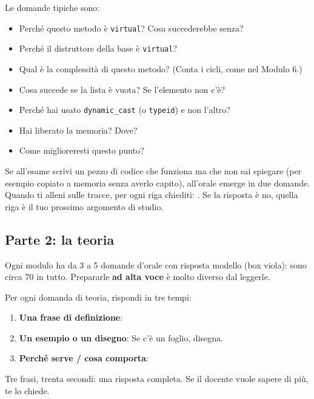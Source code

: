 Le domande tipiche sono:
\begin{itemize}
  \item Perché questo metodo è \texttt{virtual}? Cosa succederebbe senza?
  \item Perché il distruttore della base è \texttt{virtual}?
  \item Qual è la complessità di questo metodo? (Conta i cicli, come nel Modulo 6.)
  \item Cosa succede se la lista è vuota? Se l'elemento non c'è?
  \item Perché hai usato \texttt{dynamic\_cast} (o \texttt{typeid}) e non l'altro?
  \item Hai liberato la memoria? Dove?
  \item Come miglioreresti questo punto?
\end{itemize}

\begin{trappola}
Se all'esame scrivi un pezzo di codice che funziona ma che non sai spiegare (per esempio
copiato a memoria senza averlo capito), all'orale emerge in due domande. Quando ti alleni
sulle tracce, per ogni riga chiediti: . Se la risposta è no,
quella riga è il tuo prossimo argomento di studio.
\end{trappola}

\subsection*{Parte 2: la teoria}

Ogni modulo ha da 3 a 5 domande d'orale con risposta modello (box viola): sono circa 70
in tutto. Prepararle \textbf{ad alta voce} è molto diverso dal leggerle.

\begin{passopasso}
Per ogni domanda di teoria, rispondi in tre tempi:
\begin{enumerate}
  \item \textbf{Una frase di definizione}: 
  \item \textbf{Un esempio o un disegno}:  Se c'è un foglio, disegna.
  \item \textbf{Perché serve / cosa comporta}: 
\end{enumerate}
Tre frasi, trenta secondi: una risposta completa. Se il docente vuole sapere di più, te
lo chiede.
\end{passopasso}

